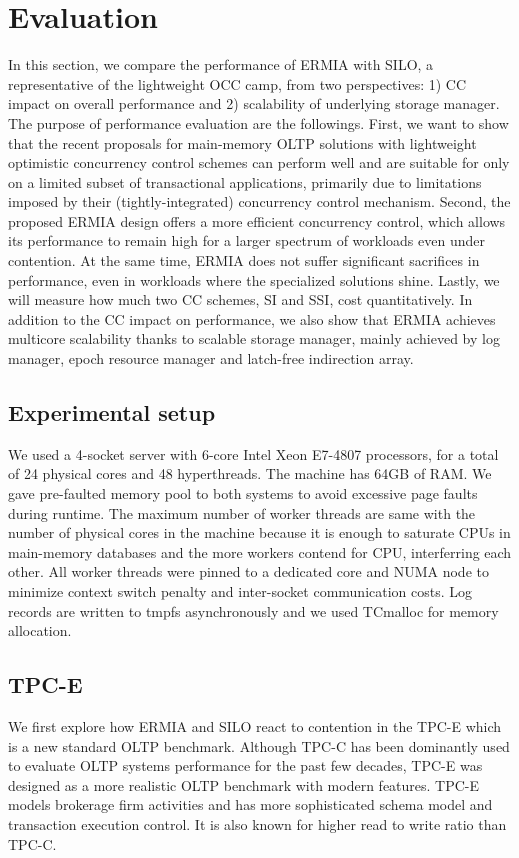 
\section{Evaluation}
In this section, we compare the performance of ERMIA with SILO, a representative of the lightweight OCC camp, from two perspectives: 1) CC impact on overall performance and 2) scalability of underlying storage manager. 
The purpose of performance evaluation are the followings. First, we want to show that the recent proposals for main-memory OLTP solutions with lightweight optimistic concurrency control schemes can perform well and are suitable for only on a limited subset of transactional applications, primarily due to limitations imposed by their (tightly-integrated) concurrency control mechanism. Second, the proposed ERMIA design offers a more efficient concurrency control, which allows its performance to remain high for a larger spectrum of workloads even under contention. At the same time, ERMIA does not suffer significant sacrifices in performance, even in workloads where the specialized solutions shine. Lastly, we will measure how much two CC schemes, SI and SSI, cost quantitatively. In addition to the CC impact on performance, we also show that ERMIA achieves multicore scalability thanks to scalable storage manager, mainly achieved by log manager, epoch resource manager and latch-free indirection array. 


\subsection{Experimental setup}
We used a 4-socket server with 6-core Intel Xeon E7-4807 processors, for a total of 24 physical cores and 48 hyperthreads. The machine has 64GB of RAM. We gave pre-faulted memory pool to both systems to avoid excessive page faults during runtime. The maximum number of worker threads are same with the number of physical cores in the machine because it is enough to saturate CPUs in main-memory databases and the more workers contend for CPU, interferring each other. All worker threads were pinned to a dedicated core and NUMA node to minimize context switch penalty and inter-socket communication costs. Log records are written to tmpfs asynchronously and we used TCmalloc for memory allocation.

\subsection{TPC-E}
We first explore how ERMIA and SILO react to contention in the TPC-E which is a new standard OLTP benchmark. Although TPC-C has been dominantly used to evaluate OLTP systems performance for the past few decades, TPC-E was designed as a more realistic OLTP benchmark with modern features. TPC-E models brokerage firm activities and has more sophisticated schema model and transaction execution control. It is also known for higher read to write ratio than TPC-C. 


